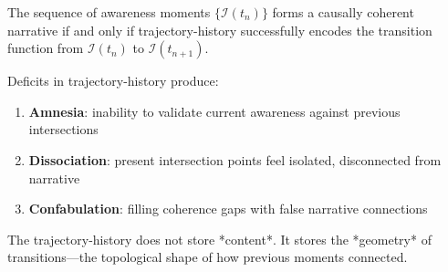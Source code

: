 \begin{theorem}
\label{thm:coherence-history}
The sequence of awareness moments $\{\mathcal{I}(t_n)\}$ forms a causally coherent narrative if and only if trajectory-history successfully encodes the transition function from $\mathcal{I}(t_n)$ to $\mathcal{I}(t_{n+1})$.

Deficits in trajectory-history produce:
\begin{enumerate}[label=(\arabic*),leftmargin=*]
\item \textbf{Amnesia}: inability to validate current awareness against previous intersections
\item \textbf{Dissociation}: present intersection points feel isolated, disconnected from narrative
\item \textbf{Confabulation}: filling coherence gaps with false narrative connections
\end{enumerate}

The trajectory-history does not store *content*. It stores the *geometry* of transitions—the topological shape of how previous moments connected.
\end{theorem}

